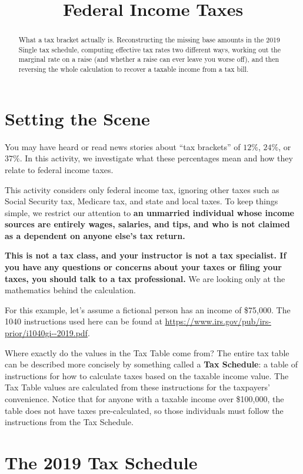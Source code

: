 \documentclass[12pt]{ximera}
\title{Federal Income Taxes}
\begin{document}
\begin{abstract}
What a tax bracket actually is. Reconstructing the missing base amounts in the 2019
Single tax schedule, computing effective tax rates two different ways, working out the
marginal rate on a raise (and whether a raise can ever leave you worse off), and then
reversing the whole calculation to recover a taxable income from a tax bill.
\end{abstract}
\maketitle

\section*{Setting the Scene}

You may have heard or read news stories about ``tax brackets'' of $12\%$, $24\%$, or
$37\%$. In this activity, we investigate what these percentages mean and how they relate
to federal income taxes.

This activity considers only federal income tax, ignoring other taxes such as Social
Security tax, Medicare tax, and state and local taxes. To keep things simple, we
restrict our attention to \textbf{an unmarried individual whose income sources are
entirely wages, salaries, and tips, and who is not claimed as a dependent on anyone
else's tax return.}

\textbf{This is not a tax class, and your instructor is not a tax specialist. If you
have any questions or concerns about your taxes or filing your taxes, you should talk
to a tax professional.} We are looking only at the mathematics behind the calculation.

For this example, let's assume a fictional person has an income of \$75,000. The 1040
instructions used here can be found at
\url{https://www.irs.gov/pub/irs-prior/i1040gi--2019.pdf}.

Where exactly do the values in the Tax Table come from? The entire tax table can be
described more concisely by something called a \textbf{Tax Schedule}: a table of
instructions for how to calculate taxes based on the taxable income value. The Tax Table
values are calculated from these instructions for the taxpayers' convenience. Notice
that for anyone with a taxable income over \$100,000, the table does not have taxes
pre-calculated, so those individuals must follow the instructions from the Tax Schedule.

\section*{The 2019 Tax Schedule}
\end{document}
